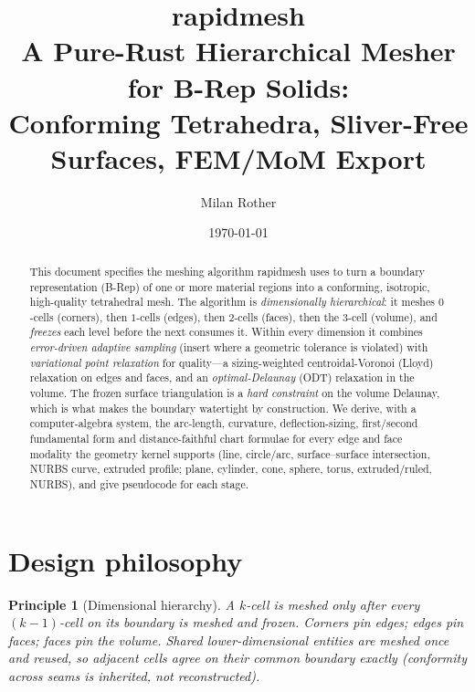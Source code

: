\documentclass[11pt,a4paper]{article}
\title{\textbf{\textcolor{rmaccent}{rapidmesh}}\\[2pt]
\large A Pure-Rust Hierarchical Mesher for B-Rep Solids:\\
\large Conforming Tetrahedra, Sliver-Free Surfaces, FEM/MoM Export}
\author{Milan Rother}
\date{\today}
\numberwithin{equation}{section}
\newtheorem{principle}{Principle}[section]
\begin{document}
\maketitle

\begin{abstract}
This document specifies the meshing algorithm rapidmesh uses to turn a
boundary representation (B-Rep) of one or more material regions into a
conforming, isotropic, high-quality tetrahedral mesh. The algorithm is
\emph{dimensionally hierarchical}: it meshes $0$-cells (corners), then $1$-cells
(edges), then $2$-cells (faces), then the $3$-cell (volume), and \emph{freezes}
each level before the next consumes it. Within every dimension it combines
\emph{error-driven adaptive sampling} (insert where a geometric tolerance is
violated) with \emph{variational point relaxation} for quality---a sizing-weighted
centroidal-Voronoi (Lloyd) relaxation on edges and faces, and an
\emph{optimal-Delaunay} (ODT) relaxation in the volume. The frozen surface
triangulation is a
\emph{hard constraint} on the volume Delaunay, which is what makes the boundary
watertight by construction. We derive, with a computer-algebra system, the
arc-length, curvature, deflection-sizing, first/second fundamental form and
distance-faithful chart formulae for every edge and face modality the geometry
kernel supports (line, circle/arc, surface--surface intersection, NURBS curve,
extruded profile; plane, cylinder, cone, sphere, torus, extruded/ruled, NURBS),
and give pseudocode for each stage.
\end{abstract}

\clearpage
\tableofcontents
\clearpage
\listoffigures
\clearpage
\listoftables
\clearpage

\section{Design philosophy}

\begin{principle}[Dimensional hierarchy]
A $k$-cell is meshed only after every $(k{-}1)$-cell on its boundary is meshed
and \emph{frozen}. Corners pin edges; edges pin faces; faces pin the volume.
Shared lower-dimensional entities are meshed once and reused, so adjacent
cells agree on their common boundary exactly (conformity across seams is
inherited, not reconstructed).
\end{principle}
\end{document}
